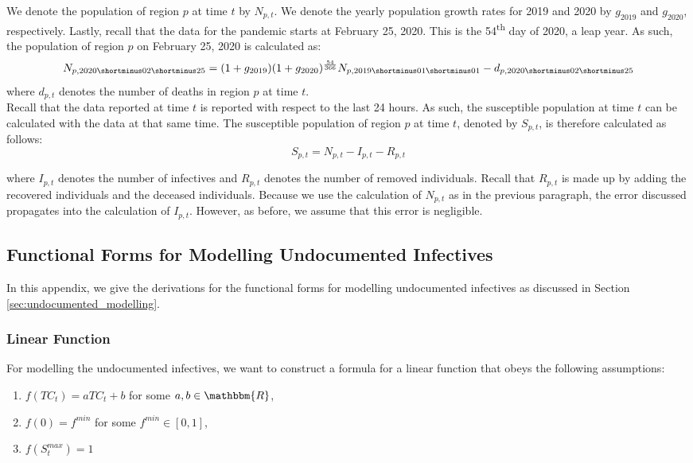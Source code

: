 \documentclass[12pt]{article}
\newcommand{\R}{\mathbbm{R}}
\begin{document}
\begin{appendices}
		We denote the population of region $p$ at time $t$ by $N_{p,t}$. We denote the yearly population growth rates for 2019 and 2020 by $g_{2019}$ and $g_{2020}$, respectively. Lastly, recall that the data for the pandemic starts at February 25, 2020. This is the 54\textsuperscript{th} day of 2020, a leap year. As such, the population of region $p$ on February 25, 2020 is calculated as:
		\begin{equation}\label{eq:calc_total_population}
		    N_{p, 2020\shortminus02\shortminus25} = (1+g_{2019})(1+g_{2020})^{\frac{54}{366}}N_{p, 2019\shortminus01\shortminus01} - d_{p, 2020\shortminus02\shortminus25}
		\end{equation}
		where $d_{p,t}$ denotes the number of deaths in region $p$ at time $t$. \\
		
		Recall that the data reported at time $t$ is reported with respect to the last 24 hours. As such, the susceptible population at time $t$ can be calculated with the data at that same time. The susceptible population of region $p$ at time $t$, denoted by $S_{p,t}$, is therefore calculated as follows:
		\begin{equation}\label{eq:calc_susceptible_population}
		    S_{p,t} = N_{p,t} - I_{p,t} - R_{p,t}
		\end{equation}
		
		\noindent where $I_{p,t}$ denotes the number of infectives and $R_{p,t}$ denotes the number of removed individuals. Recall that $R_{p,t}$ is made up by adding the recovered individuals and the deceased individuals. Because we use the calculation of $N_{p,t}$ as in the previous paragraph, the error discussed propagates into the calculation of $I_{p,t}$. However, as before, we assume that this error is negligible.
		
		\subsection{Functional Forms for Modelling Undocumented Infectives}\label{sapp:derivation_undocumented_infectives}
		In this appendix, we give the derivations for the functional forms for modelling undocumented infectives as discussed in Section \ref{sec:undocumented_modelling}.
		
		\subsubsection{Linear Function} \label{ssapp:linear_derivation}
		For modelling the undocumented infectives, we want to construct a formula for a linear function that obeys the following assumptions:
		\begin{enumerate}[label=(\Roman*)]
		    \item\label{ass:linear_formula} $f(TC_t) = aTC_t + b$  for some $a, b \in \R$,
		    \item\label{ass:linear_0} $f(0) = f^{min}$ for some $f^{min} \in [0,1]$,
		    \item\label{ass:linear_N} $f(S^{max}_t) = 1$
		\end{enumerate}
		

\end{appendices}
\end{document}
